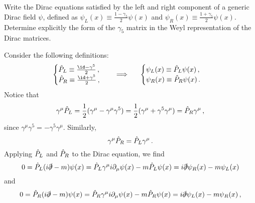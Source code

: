 \begin{ex} \label{ex_17} 
    Write the Dirac equations satisfied by the left and right component of a generic Dirac field $\psi$, defined as $\psi_L(x) \equiv \frac{1 - \gamma_5}{2}\psi(x)$ and
    $\psi_R(x) \equiv \frac{1 + \gamma_5}{2}\psi(x)$. Determine explicitly the form of the $\gamma_5$ matrix in the Weyl representation of the Dirac matrices.
\end{ex}


\begin{sol}
    Consider the following definitions:
    \begin{equation}
    \begin{cases}
        \PL \define \frac{\id - \gamma^5}{2} \, , \\
        \PR \define \frac{\id + \gamma^5}{2} \, , \\
    \end{cases} 
    \quad \Longrightarrow \quad \;\;
    \begin{cases}
        \psi_L(x) \define \PL \psi(x) \, , \\
        \psi_R(x) \define \PR \psi(x) \, . \\
    \end{cases} 
    \end{equation}
    Notice that
    \begin{equation}
        \gamma^\mu \hat{P}_L = \frac{1}{2} (\gamma^\mu - \gamma^\mu \gamma^5) = \frac{1}{2} (\gamma^\mu + \gamma^5\gamma^\mu) = \hat{P}_R \gamma^\mu \, , 
    \end{equation}
    since $\gamma^\mu \gamma^5 = - \gamma^5\gamma^\mu$. Similarly,
    \begin{equation}
        \gamma^\mu \hat{P}_R = \hat{P}_L \gamma^\mu \, .
    \end{equation}
    Applying $\hat{P}_L$ and $\hat{P}_R$ to the Dirac equation, we find
    \begin{equation}
        0 = \hat{P}_L (i\slashed{\partial} -m) \psi(x) = \hat{P}_L \gamma^\mu i\partial_\mu \psi(x) - m \hat{P}_L \psi(x) = i\slashed{\partial} \psi_R(x) - m \psi_L(x) 
    \end{equation}
    and
    \begin{equation}
        0 = \hat{P}_R (i\slashed{\partial} - m) \psi(x) = \hat{P}_R \gamma^\mu i \partial_\mu \psi(x) - m \hat{P}_R \psi(x) = i\slashed{\partial} \psi_L(x) - m \psi_R(x) \, ,
    \end{equation}

\end{sol}
